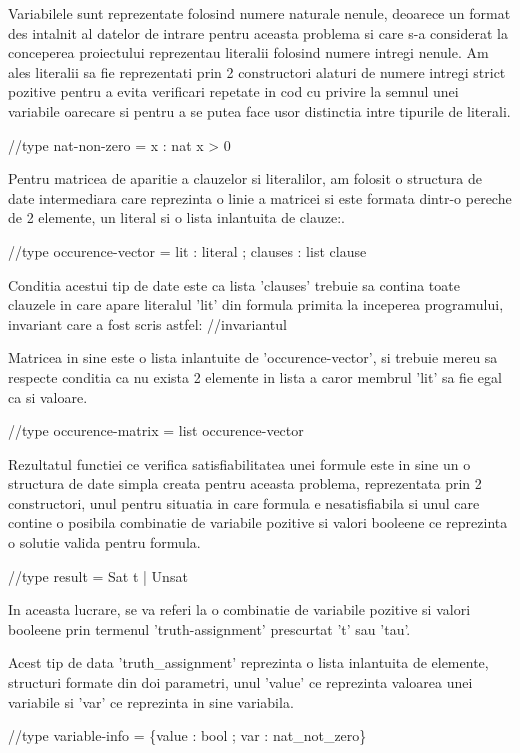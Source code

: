 Variabilele sunt reprezentate folosind numere naturale nenule, deoarece un format des intalnit al datelor de intrare pentru aceasta problema si care s-a considerat la conceperea proiectului reprezentau literalii folosind numere intregi nenule. Am ales literalii sa fie reprezentati prin 2 constructori alaturi de numere intregi strict pozitive pentru a evita verificari repetate in cod cu privire la semnul unei variabile oarecare si pentru a se putea face usor distinctia intre tipurile de literali.

//type nat-non-zero = x : nat {x > 0}


Pentru matricea de aparitie a clauzelor si literalilor, am folosit o structura de date intermediara care reprezinta o linie a matricei si este formata dintr-o pereche de 2 elemente, un literal si o lista inlantuita de clauze:.

//type occurence-vector = {lit : literal ; clauses : list clause}

Conditia acestui tip de date este ca lista 'clauses' trebuie sa contina toate clauzele in care apare literalul 'lit' din formula primita la inceperea programului, invariant care a fost scris astfel:
//invariantul

Matricea in sine este o lista inlantuite de 'occurence-vector', si trebuie mereu sa respecte conditia ca nu exista 2 elemente in lista a caror membrul 'lit' sa fie egal ca si valoare.

//type occurence-matrix = list occurence-vector


Rezultatul functiei ce verifica satisfiabilitatea unei formule este in sine un o structura de date simpla creata pentru aceasta problema, reprezentata prin 2 constructori, unul pentru situatia in care formula e nesatisfiabila si unul care contine o posibila combinatie de variabile pozitive si valori booleene ce reprezinta o solutie valida pentru formula. 

//type result = Sat t | Unsat

In aceasta lucrare, se va referi la o combinatie de variabile pozitive si valori booleene prin termenul 'truth-assignment' prescurtat 't' sau 'tau'.

Acest tip de data 'truth\_assignment' reprezinta o lista inlantuita de elemente, structuri formate din doi parametri, unul 'value' ce reprezinta valoarea unei variabile si 'var' ce reprezinta in sine variabila.

//type variable-info = \{value : bool ; var : nat\_not\_zero\}

